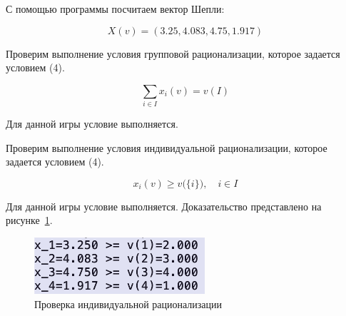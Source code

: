 С помощью программы посчитаем вектор Шепли:

\[
  X(v) = (3.25, 4.083, 4.75, 1.917)
\]

Проверим выполнение условия групповой рационализации, которое задается условием (4).

\begin{equation}
  \sum_{i \in I} x_i(v) = v(I)
\end{equation}

Для данной игры условие выполняется.

Проверим выполнение условия индивидуальной рационализации, которое задается условием (4).

\begin{equation}
  x_i(v) \geq v\bigl(\{i\}\bigr), \quad i \in I
\end{equation}

Для данной игры условие выполняется. Доказательство представлено на рисунке~\ref{fig:fig01}.

\begin{figure}
  \centering
  \includegraphics[scale=0.6]{../../artifacts/lw5/1.png}
  \caption{Проверка индивидуальной рационализации}
  \label{fig:fig01}
\end{figure}
